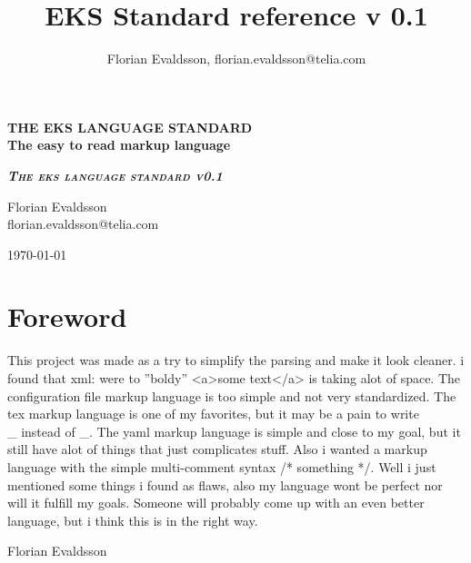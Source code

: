 \documentclass{book}
\title{\textbf{EKS Standard reference v 0.1}}
\author{Florian Evaldsson, florian.evaldsson@telia.com}
\begin{document}
	
	\begin{singlespace}
	\begin{titlepage}

	\begin{center}
  

	\textbf{\MakeUppercase{The eks language standard}} \\
  
	\textbf{The easy to read markup language}

	\vfill

	{
		\Large
		\textsc{\textbf{\textit{The eks language standard v0.1}}}
		\normalsize
	}

	\vfill

	Florian Evaldsson \\ florian.evaldsson@telia.com

	\end{center}

	\end{titlepage}
	\end{singlespace}
	
	\begin{singlespace}
	{\raggedleft{}\today} \\

	\section*{Foreword}

	This project was made as a try to simplify the parsing and make it look cleaner.
	i found that xml: were to ''boldy'' <a>some text</a> is taking alot of space. The configuration file markup language is too simple and not very standardized. 
	The tex markup language is one of my favorites, but it may be a pain to write \\\_ instead of \_. 
	The yaml markup language is simple and close to my goal, but it still have alot of things that just complicates stuff. Also i wanted a markup language with the simple multi-comment syntax /* something */.
	Well i just mentioned some things i found as flaws, also my language wont be perfect nor will it fulfill my goals. Someone will probably come up with an even better language, but i think this is in the right way.
	
	\vspace{1em}
	{\raggedleft{}Florian Evaldsson}
	\end{singlespace}
	\newpage
	
\end{document}

